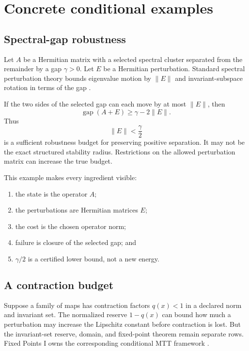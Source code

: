 \documentclass[11pt]{article}
\theoremstyle{definition}
\theoremstyle{remark}
\begin{document}
\section{Concrete conditional examples}
\label{sec:examples}

\subsection{Spectral-gap robustness}

Let \(A\) be a Hermitian matrix with a selected spectral cluster separated
from the remainder by a gap \(\gamma>0\).  Let \(E\) be a Hermitian
perturbation.  Standard spectral perturbation theory bounds eigenvalue
motion by \(\|E\|\) and invariant-subspace rotation in terms of the gap
\cite{Kato1966,DavisKahan1970}.

If the two sides of the selected gap can each move by at most \(\|E\|\),
then
\[
 \operatorname{gap}(A+E)
 \ge
 \gamma-2\|E\|.
\]
Thus
\[
 \|E\|<\frac{\gamma}{2}
\]
is a sufficient robustness budget for preserving positive separation.
It may not be the exact structured stability radius.  Restrictions on the
allowed perturbation matrix can increase the true budget.

This example makes every ingredient visible:
\begin{enumerate}[leftmargin=2em]
\item the state is the operator \(A\);
\item the perturbations are Hermitian matrices \(E\);
\item the cost is the chosen operator norm;
\item failure is closure of the selected gap; and
\item \(\gamma/2\) is a certified lower bound, not a new energy.
\end{enumerate}

\subsection{A contraction budget}

Suppose a family of maps has contraction factors \(q(x)<1\) in a declared
norm and invariant set.  The normalized reserve \(1-q(x)\) can bound how
much a perturbation may increase the Lipschitz constant before contraction
is lost.  But the invariant-set reserve, domain, and fixed-point theorem
remain separate rows.  Fixed Points I owns the corresponding conditional
MTT framework \cite{FixedPointsI2026}.
\end{document}
